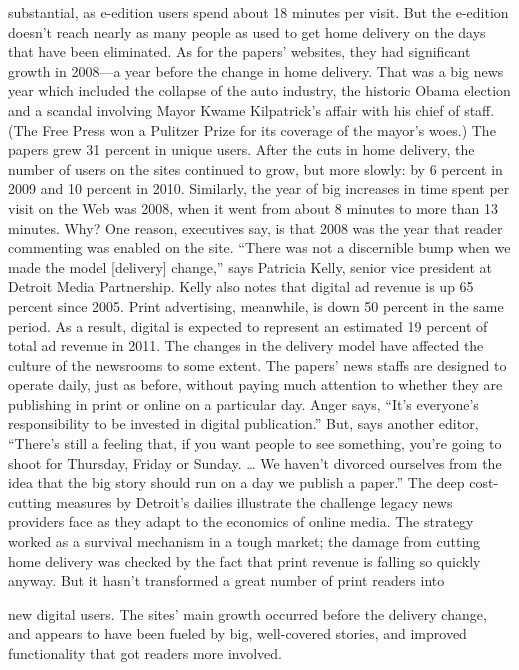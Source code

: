 substantial, as e-edition users spend about 18 minutes per visit. But the e-edition
doesn’t reach nearly as many people as used to get home delivery on the days
that have been eliminated.
As for the papers’ websites, they had significant growth in 2008—a year before
the change in home delivery. That was a big news year which included the collapse
of the auto industry, the historic Obama election and a scandal involving Mayor
Kwame Kilpatrick’s affair with his chief of staff. (The Free Press won a Pulitzer
Prize for its coverage of the mayor’s woes.) The papers grew 31 percent in unique
users. After the cuts in home delivery, the number of users on the sites continued to
grow, but more slowly: by 6 percent in 2009 and 10 percent in 2010.
Similarly, the year of big increases in time spent per visit on the Web was 2008,
when it went from about 8 minutes to more than 13 minutes. Why? One reason,
executives say, is that 2008 was the year that reader commenting was enabled on
the site. ``There was not a discernible bump when we made the model [delivery]
change,'' says Patricia Kelly, senior vice president at Detroit Media Partnership.
Kelly also notes that digital ad revenue is up 65 percent since 2005. Print advertising,
meanwhile, is down 50 percent in the same period. As a result, digital is
expected to represent an estimated 19 percent of total ad revenue in 2011.
The changes in the delivery model have affected the culture of the newsrooms
to some extent. The papers’ news staffs are designed to operate daily, just as before,
without paying much attention to whether they are publishing in print or
online on a particular day. Anger says, ``It’s everyone’s responsibility to be invested
in digital publication.'' But, says another editor, ``There’s still a feeling that, if you
want people to see something, you’re going to shoot for Thursday, Friday or
Sunday. … We haven’t divorced ourselves from the idea that the big story should
run on a day we publish a paper.''
The deep cost-cutting measures by Detroit’s dailies illustrate the challenge
legacy news providers face as they adapt to the economics of online media. The
strategy worked as a survival mechanism in a tough market; the damage from
cutting home delivery was checked by the fact that print revenue is falling so
quickly anyway. But it hasn’t transformed a great number of print readers into

new digital users. The sites’ main growth occurred before the delivery change,
and appears to have been fueled by big, well-covered stories, and improved functionality
that got readers more involved.

